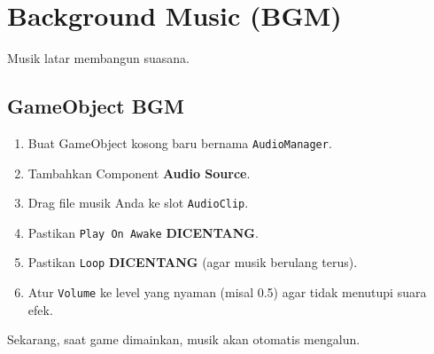 
\section{Background Music (BGM)}

Musik latar membangun suasana.

\subsection{GameObject BGM}
\begin{enumerate}
    \item Buat GameObject kosong baru bernama \texttt{AudioManager}.
    \item Tambahkan Component \textbf{Audio Source}.
    \item Drag file musik Anda ke slot \texttt{AudioClip}.
    \item Pastikan \texttt{Play On Awake} \textbf{DICENTANG}.
    \item Pastikan \texttt{Loop} \textbf{DICENTANG} (agar musik berulang terus).
    \item Atur \texttt{Volume} ke level yang nyaman (misal 0.5) agar tidak menutupi suara efek.
\end{enumerate}

Sekarang, saat game dimainkan, musik akan otomatis mengalun.
